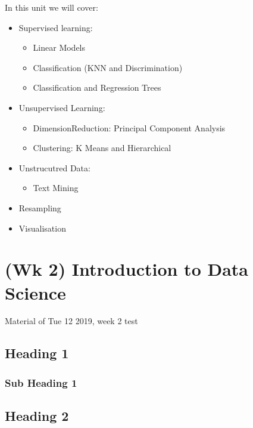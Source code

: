 \documentclass[]{book}
\providecommand{\tightlist}{%
  \setlength{\itemsep}{0pt}\setlength{\parskip}{0pt}}
\begin{document}
In this unit we will cover:

\begin{itemize}
\tightlist
\item
  Supervised learning:

  \begin{itemize}
  \tightlist
  \item
    Linear Models
  \item
    Classification (KNN and Discrimination)
  \item
    Classification and Regression Trees
  \end{itemize}
\item
  Unsupervised Learning:

  \begin{itemize}
  \tightlist
  \item
    DimensionReduction: Principal Component Analysis
  \item
    Clustering: K Means and Hierarchical
  \end{itemize}
\item
  Unstrucutred Data:

  \begin{itemize}
  \tightlist
  \item
    Text Mining
  \end{itemize}
\item
  Resampling
\item
  Visualisation
\end{itemize}

\hypertarget{wk-2-introduction-to-data-science}{%
\chapter{(Wk 2) Introduction to Data Science}\label{wk-2-introduction-to-data-science}}

Material of Tue 12 2019, week 2 test

\hypertarget{heading-1}{%
\section{Heading 1}\label{heading-1}}

\hypertarget{sub-heading-1}{%
\subsection{Sub Heading 1}\label{sub-heading-1}}

\hypertarget{heading-2}{%
\section{Heading 2}\label{heading-2}}
\end{document}
